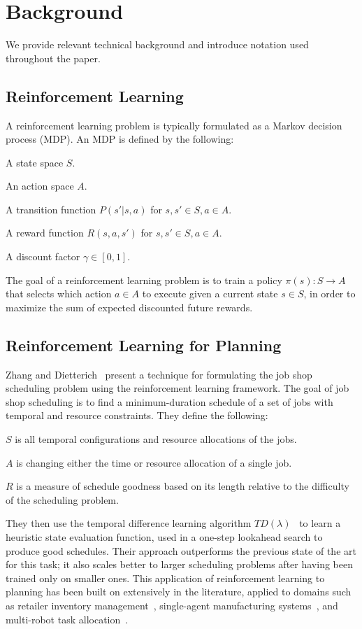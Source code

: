 \section{Background}
We provide relevant technical background and introduce notation
used throughout the paper.

\subsection{Reinforcement Learning}
A reinforcement learning problem is typically formulated as
a Markov decision process (MDP). An MDP is defined by the following:

\begin{tightlist}
\item A state space $S$.
\item An action space $A$.
\item A transition function $P(s' | s, a)$ for $s, s' \in S, a \in A$.
\item A reward function $R(s, a, s')$ for $s, s' \in S, a \in A$.
\item A discount factor $\gamma \in [0, 1]$.
\end{tightlist}
The goal of a reinforcement learning problem is to train a policy $\pi(s): S \rightarrow A$
that selects which action $a \in A$ to execute given a current state $s \in S$, in
order to maximize the sum of expected discounted future rewards.

\subsection{Reinforcement Learning for Planning}
Zhang and Dietterich~\cite{JobShopSched} present a technique for formulating the job shop scheduling
problem using the reinforcement learning framework. The goal of job shop scheduling is to find
a minimum-duration schedule of a set of jobs with temporal and resource constraints. They define the following:
\begin{tightlist}
\item $S$ is all temporal configurations and resource allocations of the jobs.
\item $A$ is changing either the time or resource allocation of a single job.
\item $R$ is a measure of schedule goodness based on its length relative to the difficulty of the scheduling problem.
\end{tightlist}
They then use the temporal difference learning algorithm $TD(\lambda)$~\cite{suttonbarto}
to learn a heuristic state evaluation function, used in a one-step lookahead search
to produce good schedules. Their approach outperforms the previous state of the art for this task;
it also scales better to larger scheduling problems after having been trained only on smaller ones.
This application of reinforcement learning to planning has been built on extensively
in the literature, applied to domains such as retailer inventory
management~\cite{van1997neuro}, single-agent manufacturing systems~\cite{Wang200573}, and multi-robot
task allocation~\cite{dahl2009multi}.

